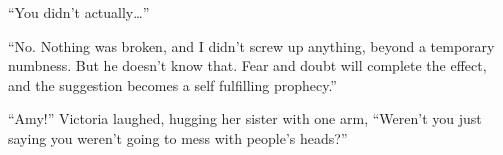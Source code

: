 ``You didn't actually\ldots''



``No.  Nothing was broken, and I didn't screw up anything, beyond a temporary numbness.  But he doesn't know that.  Fear and doubt will complete the effect, and the suggestion becomes a self fulfilling prophecy.''



``Amy!'' Victoria laughed, hugging her sister with one arm, ``Weren't you just saying you weren't going to mess with people's heads?''





